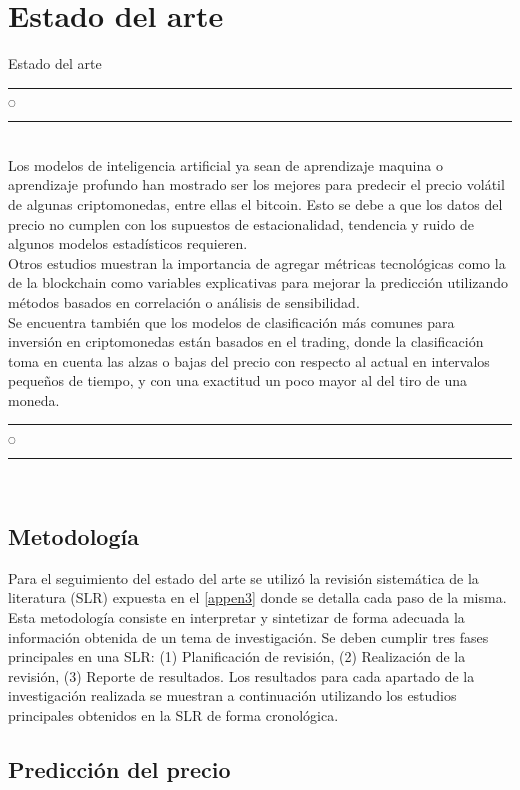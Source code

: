\chapter[Estado del arte]{Estado del arte}{Estado del arte}\label{Intro}
\renewcommand{\tablename}{Tabla}

\noindent
\rule{0.49\textwidth}{0.75pt} $_{\bigcirc}$ \rule{0.49\textwidth}{0.75pt}\\

Los modelos de inteligencia artificial ya sean de aprendizaje maquina o aprendizaje profundo han mostrado ser los mejores para predecir el precio volátil de algunas criptomonedas, entre ellas el bitcoin. Esto se debe a que los datos del precio no cumplen con los supuestos de estacionalidad, tendencia y ruido de algunos modelos estadísticos requieren.\\
Otros estudios muestran la importancia de agregar métricas tecnológicas como la de la blockchain como variables explicativas para mejorar la predicción utilizando métodos basados en correlación o análisis de sensibilidad.\\
Se encuentra también que los modelos de clasificación más comunes para inversión en criptomonedas están basados en el trading, donde la clasificación toma en cuenta las alzas o bajas del precio con respecto al actual en intervalos pequeños de tiempo, y con una exactitud un poco mayor al del tiro de una moneda.\\

\noindent
\rule{0.49\textwidth}{0.75pt} $_{\bigcirc}$ \rule{0.49\textwidth}{0.75pt}\\
\clearpage

\section{Metodología} 

Para el seguimiento del estado del arte se utilizó la revisión sistemática de la literatura (SLR) expuesta en el \autoref{appen3} donde se detalla cada paso de la misma. Esta metodología consiste en interpretar y sintetizar de forma adecuada la información obtenida de un tema de investigación. Se deben cumplir tres fases principales en una SLR: (1) Planificación de revisión, (2) Realización de la revisión, (3) Reporte de resultados. Los resultados para cada apartado de la investigación realizada se muestran a continuación utilizando los estudios principales obtenidos en la SLR de forma cronológica.

\section{Predicción del precio}

